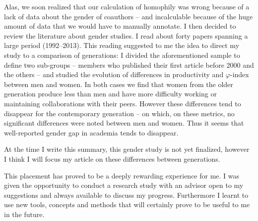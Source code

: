 Alas, we soon realized that our calculation of homophily was wrong because of a lack of data about the gender of coauthors -- and incalculable because of the huge amount of data that we would have to manually annotate. I then decided to review the literature about gender studies. I read about forty papers spanning a large period (1992--2013). This reading suggested to me the idea to direct my study to a comparison of generations: I divided the aforementioned sample to define two sub-groups -- members who published their first article before 2000 and the others -- and studied the evolution of differences in productivity and $\varphi$-index between men and women. In both cases we find that women from the older generation produce less than men and have more difficulty working or maintaining collaborations with their peers. However these differences tend to disappear for the contemporary generation -- on which, on these metrics, no significant differences were noted between men and women. Thus it seems that well-reported gender gap in academia tends to disappear.

At the time I write this summary, this gender study is not yet finalized, however I think I will focus my article on these differences between generations.


This placement has proved to be a deeply rewarding experience for me. I was given the opportunity to conduct a research study with an advisor open to my suggestions and always available to discuss my progress. Furthermore I learnt to use new tools, concepts and methods that will certainly prove to be useful to me in the future.